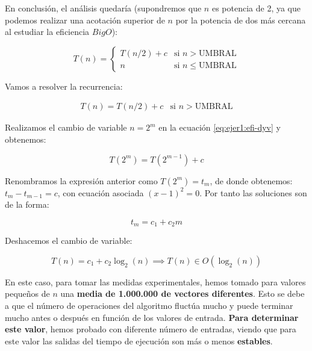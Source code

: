 En conclusión, el análisis quedaría (supondremos que $n$ es potencia de 2, ya que podemos realizar una acotación 
superior de $n$ por la potencia de dos más cercana al estudiar la eficiencia $Big O$): 

\begin{equation}
    T(n) = \left\{ \begin{array}{lr} T(n/2) + c & \text{si } n > \text{UMBRAL}\\ n & \text{si } n \leqslant \text{UMBRAL} \end{array} \right.
    \label{eq:1a-efi-dyv-rec}
\end{equation}

Vamos a resolver la recurrencia:

\begin{equation}
    \begin{array}{lr}  T(n) =  T(n/2) + c & \text{si } n > \text{UMBRAL} \end{array}
    \label{eq:ejer1:efi-dyv}
\end{equation}

Realizamos el cambio de variable $n = 2^{m}$ en la ecuación \ref{eq:ejer1:efi-dyv} y obtenemos:

\begin{equation*}
    T(2^{m}) =  T(2^{m-1}) + c 
\end{equation*}

Renombramos la expresión anterior como $T(2^{m}) = t_{m}$, de donde obtenemos: $t_{m} - t_{m-1} = c$, con
ecuación asociada $(x-1)^{2} = 0$. Por tanto las soluciones son de la forma: 

\begin{equation*}
    t_{m} = c_{1} + c_{2}m
\end{equation*}

Deshacemos el cambio de variable:

\begin{equation}
    T(n) = c_{1} + c_{2} \log_2(n) \implies \boxed{T(n) \in O(\log_2(n))}
    \label{eq:1a-eficiencia-lineal}
\end{equation}

En este caso, para tomar las medidas experimentales, hemos tomado para valores pequeños de $n$ una 
\textbf{media de 1.000.000 de vectores diferentes}. Esto se debe a que el número de operaciones del 
algoritmo fluctúa mucho y puede terminar mucho antes o después en función
de los valores de entrada. \textbf{Para determinar este valor}, hemos probado con diferente número de entradas, 
viendo que para este valor las salidas del tiempo de ejecución son más o menos \textbf{estables}. 

